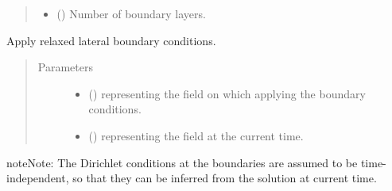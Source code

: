 \documentclass[letterpaper,10pt,english]{sphinxmanual}
\begin{document}
\begin{fulllineitems}
\begin{fulllineitems}
\begin{quote}
\begin{description}
\begin{itemize}
\item {} 
 () \textendash{} Number of boundary layers.

\end{itemize}

\end{description}\end{quote}

\end{fulllineitems}


\begin{fulllineitems}
\label{\detokenize{api:tasmania.dycore.horizontal_boundary_relaxed.Relaxed.apply}}
Apply relaxed lateral boundary conditions.
\begin{quote}\begin{description}
\item[{Parameters}] \leavevmode\begin{itemize}
\item {} 
 () \textendash{}  representing the field on which applying the boundary conditions.

\item {} 
 () \textendash{}  representing the field at the current time.

\end{itemize}

\end{description}\end{quote}

\begin{sphinxadmonition}{note}{Note:}
The Dirichlet conditions at the boundaries are assumed to be time-independent, so that they
can be inferred from the solution at current time.
\end{sphinxadmonition}

\end{fulllineitems}


\end{fulllineitems}
\end{document}

